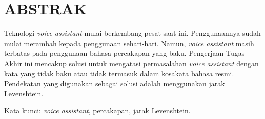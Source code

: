 \clearpage
\chapter*{ABSTRAK}

Teknologi \textit{voice assistant} mulai berkembang pesat saat ini. Penggunaannya sudah mulai merambah kepada penggunaan sehari-hari. Namun, \textit{voice assistant} masih terbatas pada penggunaan bahasa percakapan yang baku. Pengerjaan Tugas Akhir ini mencakup solusi untuk mengatasi permasalahan \textit{voice assistant} dengan kata yang tidak baku atau tidak termasuk dalam kosakata bahasa resmi. Pendekatan yang digunakan sebagai solusi adalah menggunakan jarak Levenshtein.

\vspace{15mm}
Kata kunci: \textit{voice assistant}, percakapan, jarak Levenshtein.
\clearpage